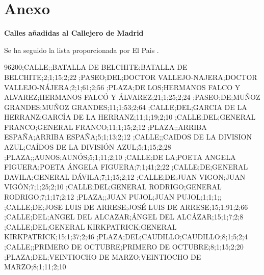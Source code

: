 \chapter*{Anexo}

\textbf{Calles añadidas al Callejero de Madrid}

Se ha seguido la lista proporcionada por El Pais \cite{calles_cambioNombre_elPais}.

\begin{tiny}
96200;CALLE;;BATALLA DE BELCHITE;BATALLA DE BELCHITE;2;1;15;2;22
;PASEO;DEL;DOCTOR VALLEJO-NAJERA;DOCTOR VALLEJO-NÁJERA;2;1;61;2;56
;PLAZA;DE LOS;HERMANOS FALCO Y ALVAREZ;HERMANOS FALCÓ Y ÁLVAREZ;21;1;25;2;24
;PASEO;DE;MUÑOZ GRANDES;MUÑOZ GRANDES;11;1;53;2;64
;CALLE;DEL;GARCIA DE LA HERRANZ;GARCÍA DE LA HERRANZ;11;1;19;2;10
;CALLE;DEL;GENERAL FRANCO;GENERAL FRANCO;11;1;15;2;12
;PLAZA;;ARRIBA ESPAÑA;ARRIBA ESPAÑA;5;1;13;2;12
;CALLE;;CAIDOS DE LA DIVISION AZUL;CAÍDOS DE LA DIVISIÓN AZUL;5;1;15;2;28
;PLAZA;;AUNOS;AUNÓS;5;1;11;2;10
;CALLE;DE LA;POETA ANGELA FIGUERA;POETA ÁNGELA FIGUERA;7;1;41;2;22
;CALLE;DE;GENERAL DAVILA;GENERAL DÁVILA;7;1;15;2;12
;CALLE;DE;JUAN VIGON;JUAN VIGÓN;7;1;25;2;10
;CALLE;DEL;GENERAL RODRIGO;GENERAL RODRIGO;7;1;17;2;12
;PLAZA;;JUAN PUJOL;JUAN PUJOL;1;1;1;;
;CALLE;DE;JOSE LUIS DE ARRESE;JOSÉ LUIS DE ARRESE;15;1;91;2;66
;CALLE;DEL;ANGEL DEL ALCAZAR;ÁNGEL DEL ALCÁZAR;15;1;7;2;8
;CALLE;DEL;GENERAL KIRKPATRICK;GENERAL KIRKPATRICK;15;1;37;2;46
;PLAZA;DEL;CAUDILLO;CAUDILLO;8;1;5;2;4
;CALLE;;PRIMERO DE OCTUBRE;PRIMERO DE OCTUBRE;8;1;15;2;20
;PLAZA;DEL;VEINTIOCHO DE MARZO;VEINTIOCHO DE MARZO;8;1;11;2;10

\end{tiny}
